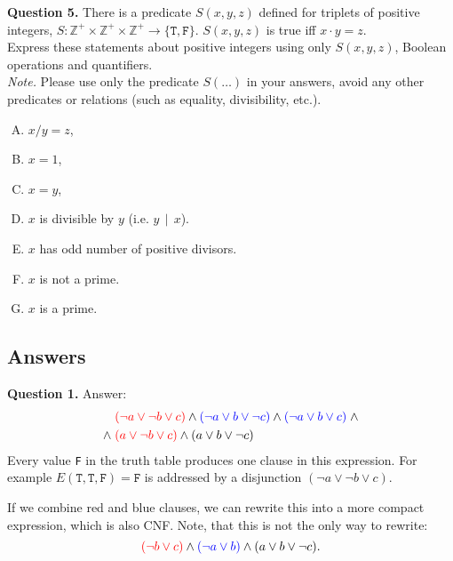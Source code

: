\documentclass[jou]{apa6}
\begin{document}
\vspace{10pt}
{\bf Question 5.}
There is a predicate $S(x, y, z)$ defined for triplets
of positive integers, 
$S: \mathbb{Z}^{+} \times \mathbb{Z}^{+} \times \mathbb{Z}^{+} \rightarrow \{ \mathtt{T}, \mathtt{F} \}$. 
$S(x,y,z)$ is true iff $x \cdot y = z$.\\
Express these statements about positive integers
using only $S(x,y,z)$, Boolean operations and quantifiers.\\
{\em Note.} Please use only the predicate $S(\ldots)$ in your answers, 
avoid any other predicates or relations (such as equality, divisibility, etc.).

\begin{enumerate}[(A)] 
\item $x/y = z$,
\item $x = 1$,
\item $x = y$, 
\item $x$ is divisible by $y$ (i.e. $y \,\mid\, x$). 
\item $x$ has odd number of positive divisors.
\item $x$ is not a prime.
\item $x$ is a prime.
\end{enumerate}




\subsection{Answers}

\vspace{6pt}
{\bf Question 1.} Answer: 
\begin{align}
 & \textcolor{red}{(\neg a \vee \neg b \vee c)} \wedge 
\textcolor{blue}{(\neg a \vee b \vee \neg c)} \wedge 
\textcolor{blue}{(\neg a \vee b \vee c)} \;\wedge \nonumber \\
\wedge\; & \textcolor{red}{(a \vee \neg b \vee c)} \wedge 
(a \vee b \vee \neg c) \nonumber
\end{align}
Every value {\tt F} in the truth table produces one 
clause in this expression. For example $E(\mathtt{T},\mathtt{T},\mathtt{F}) = \mathtt{F}$
is addressed by a disjunction $(\neg a \vee \neg b \vee c)$. 

If we combine red and blue clauses, we can rewrite this into a more compact expression, 
which is also CNF. Note, that this is not the only way to rewrite:
$$\textcolor{red}{(\neg b \vee c)} \wedge 
\textcolor{blue}{(\neg a \vee b)} \wedge
(a \vee b \vee \neg c).$$
\end{document}
